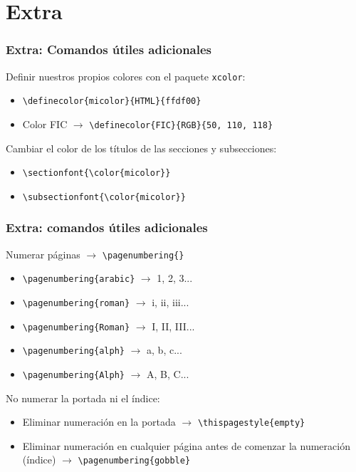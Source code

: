 \section{Extra}


\begin{frame}[fragile]
\frametitle{Extra: Comandos útiles adicionales}

\vspace{0.5cm}

Definir nuestros propios colores con el paquete \verb|xcolor|:
\begin{itemize}
    \item \verb|\definecolor{micolor}{HTML}{ffdf00}|
    \item Color FIC $\rightarrow$ \verb|\definecolor{FIC}{RGB}{50, 110, 118}|
\end{itemize}

\vspace{0.5cm} 

Cambiar el color de los títulos de las secciones y subsecciones:
\begin{itemize}
    \item \verb|\sectionfont{\color{micolor}}|
    \item \verb|\subsectionfont{\color{micolor}}|
\end{itemize}

\end{frame}

\begin{frame}[fragile]
\frametitle{Extra: comandos útiles adicionales}

Numerar páginas $\rightarrow$ \verb|\pagenumbering{}|
\begin{itemize}
    \item \verb|\pagenumbering{arabic}| $\rightarrow$ 1, 2, 3...
    \item \verb|\pagenumbering{roman}| $\rightarrow$ i, ii, iii...
    \item \verb|\pagenumbering{Roman}| $\rightarrow$ I, II, III...
    \item \verb|\pagenumbering{alph}| $\rightarrow$ a, b, c...
    \item \verb|\pagenumbering{Alph}| $\rightarrow$ A, B, C...
\end{itemize}

\vspace{0.5cm}

No numerar la portada ni el índice:
\begin{itemize}
    \item Eliminar numeración en la portada $\rightarrow$ \verb|\thispagestyle{empty}|
    \item Eliminar numeración en cualquier página antes de comenzar la numeración (índice) $\rightarrow$ \verb|\pagenumbering{gobble}|
\end{itemize}

\end{frame}

